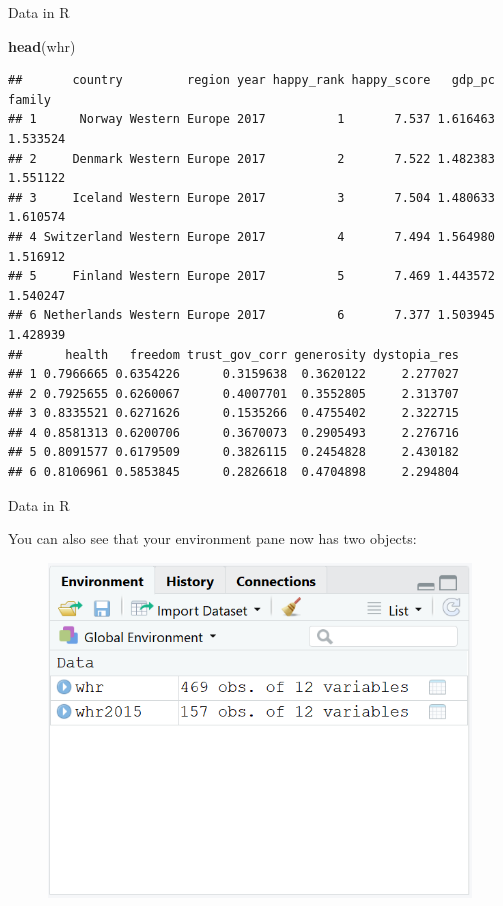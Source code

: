 \documentclass[ignorenonframetext,]{beamer}
\newenvironment{Shaded}{\begin{snugshade}}{\end{snugshade}}
\newcommand{\KeywordTok}[1]{\textcolor[rgb]{0.13,0.29,0.53}{\textbf{#1}}}
\newcommand{\NormalTok}[1]{#1}
\begin{document}
\begin{frame}[fragile]{Data in R}

\scriptsize

\begin{Shaded}
\begin{Highlighting}[]
\KeywordTok{head}\NormalTok{(whr)}
\end{Highlighting}
\end{Shaded}

\begin{verbatim}
##       country         region year happy_rank happy_score   gdp_pc   family
## 1      Norway Western Europe 2017          1       7.537 1.616463 1.533524
## 2     Denmark Western Europe 2017          2       7.522 1.482383 1.551122
## 3     Iceland Western Europe 2017          3       7.504 1.480633 1.610574
## 4 Switzerland Western Europe 2017          4       7.494 1.564980 1.516912
## 5     Finland Western Europe 2017          5       7.469 1.443572 1.540247
## 6 Netherlands Western Europe 2017          6       7.377 1.503945 1.428939
##      health   freedom trust_gov_corr generosity dystopia_res
## 1 0.7966665 0.6354226      0.3159638  0.3620122     2.277027
## 2 0.7925655 0.6260067      0.4007701  0.3552805     2.313707
## 3 0.8335521 0.6271626      0.1535266  0.4755402     2.322715
## 4 0.8581313 0.6200706      0.3670073  0.2905493     2.276716
## 5 0.8091577 0.6179509      0.3826115  0.2454828     2.430182
## 6 0.8106961 0.5853845      0.2826618  0.4704898     2.294804
\end{verbatim}

\end{frame}

\begin{frame}{Data in R}

You can also see that your environment pane now has two objects:

\begin{figure}
\centering
  \includegraphics[scale=0.5]{img/enviroment_2vars.png}
\end{figure}

\end{frame}
\end{document}

